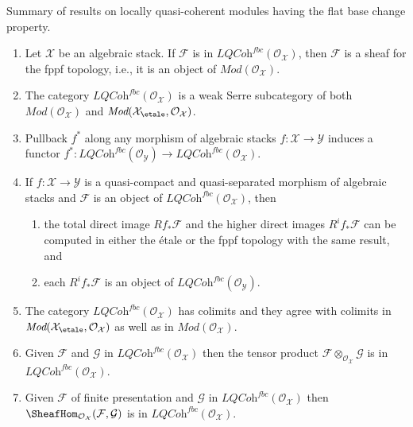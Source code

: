 \begin{proposition}
\label{proposition-loc-qcoh-flat-base-change}
Summary of results on locally quasi-coherent modules having the flat
base change property.
\begin{enumerate}
\item Let $\mathcal{X}$ be an algebraic stack.
If $\mathcal{F}$ is in $\textit{LQCoh}^{fbc}(\mathcal{O}_\mathcal{X})$,
then $\mathcal{F}$ is a sheaf for the fppf topology, i.e., it is
an object of $\textit{Mod}(\mathcal{O}_\mathcal{X})$.
\item The category $\textit{LQCoh}^{fbc}(\mathcal{O}_\mathcal{X})$
is a weak Serre subcategory of both $\textit{Mod}(\mathcal{O}_\mathcal{X})$
and $\textit{Mod}(\mathcal{X}_\etale, \mathcal{O}_\mathcal{X})$.
\item Pullback $f^*$ along any morphism of algebraic stacks
$f : \mathcal{X} \to \mathcal{Y}$ induces a functor
$f^* : \textit{LQCoh}^{fbc}(\mathcal{O}_\mathcal{Y}) \to
\textit{LQCoh}^{fbc}(\mathcal{O}_\mathcal{X})$.
\item If $f : \mathcal{X} \to \mathcal{Y}$ is a
quasi-compact and quasi-separated morphism of algebraic stacks
and $\mathcal{F}$ is an object of
$\textit{LQCoh}^{fbc}(\mathcal{O}_\mathcal{X})$, then
\begin{enumerate}
\item the total direct image $Rf_*\mathcal{F}$ and the higher direct
images $R^if_*\mathcal{F}$ can be computed in either the \'etale or the
fppf topology with the same result, and
\item each $R^if_*\mathcal{F}$ is an object of
$\textit{LQCoh}^{fbc}(\mathcal{O}_\mathcal{Y})$.
\end{enumerate}
\item The category $\textit{LQCoh}^{fbc}(\mathcal{O}_\mathcal{X})$ has
colimits and they agree with colimits in
$\textit{Mod}(\mathcal{X}_\etale, \mathcal{O}_\mathcal{X})$
as well as in $\textit{Mod}(\mathcal{O}_\mathcal{X})$.
\item Given $\mathcal{F}$ and $\mathcal{G}$ in
$\textit{LQCoh}^{fbc}(\mathcal{O}_\mathcal{X})$ then the tensor product
$\mathcal{F} \otimes_{\mathcal{O}_\mathcal{X}} \mathcal{G}$
is in $\textit{LQCoh}^{fbc}(\mathcal{O}_\mathcal{X})$.
\item Given $\mathcal{F}$ of finite presentation and $\mathcal{G}$ in
$\textit{LQCoh}^{fbc}(\mathcal{O}_\mathcal{X})$ then
$\SheafHom_{\mathcal{O}_\mathcal{X}}(\mathcal{F}, \mathcal{G})$
is in $\textit{LQCoh}^{fbc}(\mathcal{O}_\mathcal{X})$.
\end{enumerate}
\end{proposition}

